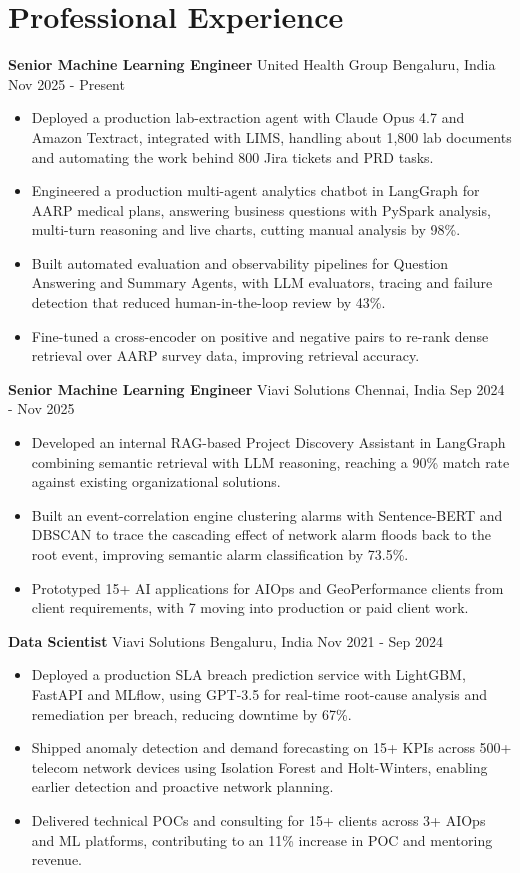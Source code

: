 \documentclass[10pt,a4paper]{article}
\newcommand{\role}[4]{\textbf{#1} \textbar{} #2 \hfill #3 \textbar{} #4\par}
\begin{document}
\section{Professional Experience}
\role{Senior Machine Learning Engineer}{United Health Group}{Bengaluru, India}{Nov 2025 - Present}
\begin{itemize}
  \item Deployed a production lab-extraction agent with Claude Opus 4.7 and Amazon Textract, integrated with LIMS, handling about 1,800 lab documents and automating the work behind 800 Jira tickets and PRD tasks.
  \item Engineered a production multi-agent analytics chatbot in LangGraph for AARP medical plans, answering business questions with PySpark analysis, multi-turn reasoning and live charts, cutting manual analysis by 98\%.
  \item Built automated evaluation and observability pipelines for Question Answering and Summary Agents, with LLM evaluators, tracing and failure detection that reduced human-in-the-loop review by 43\%.
  \item Fine-tuned a cross-encoder on positive and negative pairs to re-rank dense retrieval over AARP survey data, improving retrieval accuracy.
\end{itemize}
\vspace{3pt}
\role{Senior Machine Learning Engineer}{Viavi Solutions}{Chennai, India}{Sep 2024 - Nov 2025}
\begin{itemize}
  \item Developed an internal RAG-based Project Discovery Assistant in LangGraph combining semantic retrieval with LLM reasoning, reaching a 90\% match rate against existing organizational solutions.
  \item Built an event-correlation engine clustering alarms with Sentence-BERT and DBSCAN to trace the cascading effect of network alarm floods back to the root event, improving semantic alarm classification by 73.5\%.
  \item Prototyped 15+ AI applications for AIOps and GeoPerformance clients from client requirements, with 7 moving into production or paid client work.
\end{itemize}
\vspace{3pt}
\role{Data Scientist}{Viavi Solutions}{Bengaluru, India}{Nov 2021 - Sep 2024}
\begin{itemize}
  \item Deployed a production SLA breach prediction service with LightGBM, FastAPI and MLflow, using GPT-3.5 for real-time root-cause analysis and remediation per breach, reducing downtime by 67\%.
  \item Shipped anomaly detection and demand forecasting on 15+ KPIs across 500+ telecom network devices using Isolation Forest and Holt-Winters, enabling earlier detection and proactive network planning.
  \item Delivered technical POCs and consulting for 15+ clients across 3+ AIOps and ML platforms, contributing to an 11\% increase in POC and mentoring revenue.
\end{itemize}
\end{document}
